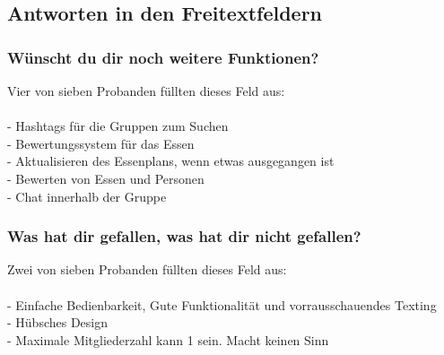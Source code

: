 \documentclass[a4paper]{scrreprt}
\begin{document}
\newpage
\subsection*{Antworten in den Freitextfeldern}

\subsubsection*{Wünscht du dir noch weitere Funktionen?}
Vier von sieben Probanden füllten dieses Feld aus: \\
\ \\
- Hashtags für die Gruppen zum Suchen \\
- Bewertungssystem für das Essen \\
- Aktualisieren des Essenplans, wenn etwas ausgegangen ist \\ 
- Bewerten von Essen und Personen \\
- Chat innerhalb der Gruppe

\subsubsection*{Was hat dir gefallen, was hat dir nicht gefallen?}
Zwei von sieben Probanden füllten dieses Feld aus: \\
\ \\
- Einfache Bedienbarkeit, Gute Funktionalität und vorrausschauendes Texting \\
- Hübsches Design \\
- Maximale Mitgliederzahl kann 1 sein. Macht keinen Sinn
\ \\
\end{document}
